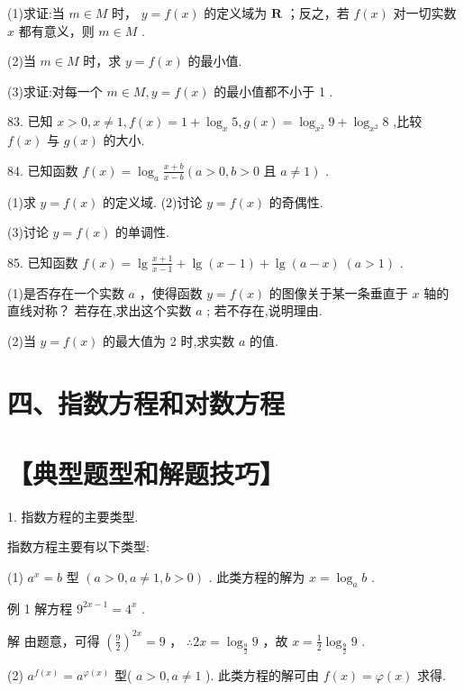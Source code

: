 \documentclass[10pt]{article}
\begin{document}
(1)求证:当 \(m \in  M\) 时， \(y = f\left( x\right)\) 的定义域为 \(\mathbf{R}\) ；反之，若 \(f\left( x\right)\) 对一切实数 \(x\) 都有意义，则 \(m \in  M\) .

(2)当 \(m \in  M\) 时，求 \(y = f\left( x\right)\) 的最小值.

(3)求证:对每一个 \(m \in  M,y = f\left( x\right)\) 的最小值都不小于 1 .

83. 已知 \(x > 0,x \neq  1,f\left( x\right)  = 1 + {\log }_{x}5,g\left( x\right)  = {\log }_{{x}^{2}}9 + {\log }_{{x}^{2}}8\) ,比较 \(f\left( x\right)\) 与 \(g\left( x\right)\) 的大小.

84. 已知函数 \(f\left( x\right)  = {\log }_{a}\frac{x + b}{x - b}\left( {a > 0,b > 0\text{ 且 }a \neq  1}\right)\) .

(1)求 \(y = f\left( x\right)\) 的定义域. (2)讨论 \(y = f\left( x\right)\) 的奇偶性.

(3)讨论 \(y = f\left( x\right)\) 的单调性.

85. 已知函数 \(f\left( x\right)  = \lg \frac{x + 1}{x - 1} + \lg \left( {x - 1}\right)  + \lg \left( {a - x}\right) \;\left( {a > 1}\right)\) .

(1)是否存在一个实数 \(a\) ，使得函数 \(y = f\left( x\right)\) 的图像关于某一条垂直于 \(x\) 轴的直线对称？ 若存在,求出这个实数 \(a\) ; 若不存在,说明理由.

(2)当 \(y = f\left( x\right)\) 的最大值为 2 时,求实数 \(a\) 的值.

\section*{四、指数方程和对数方程}

\section*{【典型题型和解题技巧】}

1. 指数方程的主要类型.

指数方程主要有以下类型:

(1) \({a}^{x} = b\) 型 \(\left( {a > 0,a \neq  1,b > 0}\right)\) . 此类方程的解为 \(x = {\log }_{a}b\) .

例 1 解方程 \({9}^{{2x} - 1} = {4}^{x}\) .

解 由题意，可得 \({\left( \frac{9}{2}\right) }^{2x} = 9\) ， \(\therefore {2x} = {\log }_{\frac{9}{2}}9\) ，故 \(x = \frac{1}{2}{\log }_{\frac{9}{2}}9\) .

(2) \({a}^{f\left( x\right) } = {a}^{\varphi \left( x\right) }\) 型( \(a > 0,a \neq  1\) ). 此类方程的解可由 \(f\left( x\right)  = \varphi \left( x\right)\) 求得.
\end{document}
